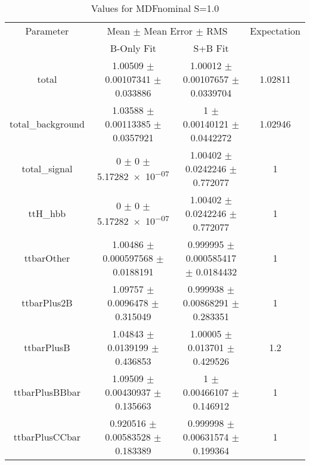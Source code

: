 \begin{table}
\centering
\caption{Values for MDFnominal S=1.0}
\begin{tabular}{cccc}
\toprule
Parameter & \multicolumn{2}{c}{Mean $\pm$ Mean Error $\pm$ RMS} & Expectation\\
 & B-Only Fit & S+B Fit & \\
\midrule
total & \num{1.00509} $\pm$ \num{0.00107341} $\pm$ \num{0.033886} & \num{1.00012} $\pm$ \num{0.00107657} $\pm$ \num{0.0339704} & \num{1.02811}\\
total\_background & \num{1.03588} $\pm$ \num{0.00113385} $\pm$ \num{0.0357921} & \num{1} $\pm$ \num{0.00140121} $\pm$ \num{0.0442272} & \num{1.02946}\\
total\_signal & \num{0} $\pm$ \num{0} $\pm$ \num{5.17282e-07} & \num{1.00402} $\pm$ \num{0.0242246} $\pm$ \num{0.772077} & \num{1}\\
ttH\_hbb & \num{0} $\pm$ \num{0} $\pm$ \num{5.17282e-07} & \num{1.00402} $\pm$ \num{0.0242246} $\pm$ \num{0.772077} & \num{1}\\
ttbarOther & \num{1.00486} $\pm$ \num{0.000597568} $\pm$ \num{0.0188191} & \num{0.999995} $\pm$ \num{0.000585417} $\pm$ \num{0.0184432} & \num{1}\\
ttbarPlus2B & \num{1.09757} $\pm$ \num{0.0096478} $\pm$ \num{0.315049} & \num{0.999938} $\pm$ \num{0.00868291} $\pm$ \num{0.283351} & \num{1}\\
ttbarPlusB & \num{1.04843} $\pm$ \num{0.0139199} $\pm$ \num{0.436853} & \num{1.00005} $\pm$ \num{0.013701} $\pm$ \num{0.429526} & \num{1.2}\\
ttbarPlusBBbar & \num{1.09509} $\pm$ \num{0.00430937} $\pm$ \num{0.135663} & \num{1} $\pm$ \num{0.00466107} $\pm$ \num{0.146912} & \num{1}\\
ttbarPlusCCbar & \num{0.920516} $\pm$ \num{0.00583528} $\pm$ \num{0.183389} & \num{0.999998} $\pm$ \num{0.00631574} $\pm$ \num{0.199364} & \num{1}\\
\bottomrule
\end{tabular}
\end{table}